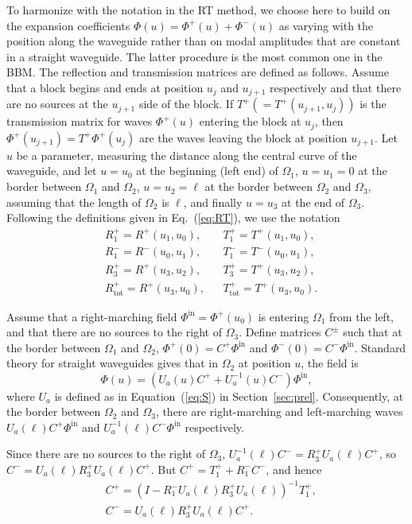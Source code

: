 \documentclass[numreferences]{kluwer}
\renewcommand{\Phi}{\varPhi}
\renewcommand{\vec}[1]{\bm{#1}}
\renewcommand{\Phi}{\varPhi}
\newcommand{\Phiin}{\vec\Phi^{\text{in}}}
\newcommand{\Ttot}{T^+_{\text{tot}}}
\newcommand{\Rtot}{R^+_{\text{tot}}}
\begin{document}
To harmonize with the notation in the RT method, we choose here to build on the expansion coefficients $\vec\Phi(u)=\vec\Phi^+(u)+\vec\Phi^-(u)$ as varying with the position along
the waveguide rather than on modal amplitudes that are constant in a straight waveguide. The latter procedure is the most common one in the BBM. The reflection and
transmission matrices are defined as follows. Assume that a block
begins and ends at position $u_j$ and $u_{j+1}$ respectively and that
there are no sources at the $u_{j+1}$ side of the block. If $T^+(=T^+(u_{j+1},u_j))$
is the transmission matrix for waves $\vec\Phi^+(u)$ entering the block
at $u_{j}$, then $\vec\Phi^+(u_{j+1})=T^+\vec\Phi^+(u_{j})$ are the waves leaving
the block at position $u_{j+1}$. Let $u$ be a parameter, measuring the
distance along the central curve of the waveguide, and let $u=u_0$ at
the beginning (left end) of $\Omega_1$, $u=u_1=0$ at the border between
$\Omega_1$ and $\Omega_2$, $u=u_2=\ell$ at the border between $\Omega_2$
and $\Omega_3$, assuming that the length of $\Omega_2$ is $\ell$,
 and finally $u=u_3$ at the end of
$\Omega_3$. Following the definitions given in Eq.~(\ref{eq:RT}), we
use the notation
\begin{align*}
  &R^+_1=R^+(u_1,u_0),&&T^+_1=T^+(u_1,u_0),\\
  &R^-_1=R^-(u_0,u_1),&&T^-_1=T^-(u_0,u_1),\\
  &R^+_3=R^+(u_3,u_2),&&T^+_3=T^+(u_3,u_2),\\
  &\Rtot=R^+(u_3,u_0),&&\Ttot=T^+(u_3,u_0).
\end{align*}

Assume that a right-marching field $\Phiin=\vec\Phi^+(u_0)$ is entering
$\Omega_1$ from the left, and that there are no sources to the right of
$\Omega_3$. Define matrices $C^\pm$ such that at the border between
$\Omega_1$ and $\Omega_2$, $\vec\Phi^+(0)=C^+\Phiin$ and
$\vec\Phi^-(0)=C^-\Phiin$. Standard theory for
straight waveguides gives that in $\Omega_2$ at position $u$, the
field is
\begin{equation}
  \label{eq:midfield}
  \vec\Phi(u)=(U_a(u)C^++U_a^{-1}(u)C^-)\Phiin,
\end{equation}
where $U_a$ is defined as in Equation~(\ref{eq:S}) in
Section~\ref{sec:prel}.  Consequently, at the border between
$\Omega_2$ and $\Omega_3$, there are right-marching and left-marching
waves $U_a(\ell)C^+\Phiin$ and $U_a^{-1}(\ell)C^-\Phiin$ respectively.

Since there are no sources to the right of $\Omega_3$,
$U_a^{-1}(\ell)C^-=R_3^{+}U_a(\ell)C^+$, so
$C^-=U_a(\ell)R_3^{+}U_a(\ell)C^+$. But $C^+=T_1^{+}+R_1^{-}C^-$, and
hence
\begin{equation}
  \label{eq:ABRtotTtot}
  \begin{split}
    &C^+=\left(I-R_1^{-}U_a(\ell)R_3^{+}U_a(\ell)\right)^{-1}T_1^{+},\\
    &C^-=U_a(\ell)R_3^{+}U_a(\ell)C^+.
      \end{split}
\end{equation}
\end{document}
